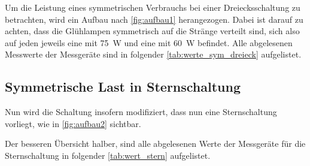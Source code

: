 \documentclass[12pt,english,ngerman]{scrartcl}
\begin{document}
Um die Leistung eines symmetrischen Verbrauchs bei einer Dreiecksschaltung zu
betrachten, wird ein Aufbau nach \autoref{fig:aufbau1} herangezogen. Dabei ist
darauf zu achten, dass die Glühlampen symmetrisch auf die Stränge verteilt
sind, sich also auf jeden jeweils eine mit \SI[]{75}{\watt} und eine mit
\SI[]{60}{\watt} befindet. Alle abgelesenen Messwerte der Messgeräte sind in
folgender \autoref{tab:werte_sym_dreieck} aufgelistet.

\begin{table}[H]
	\caption[Abgelesene Werte bei symmetrischer Belastung in Dreiecksschaltung] {Abgelesene
		Werte bei symmetrischer Belastung in Dreiecksschaltung                     \\
		$I_i \dots$ gemessener Strom am i-ten Strang in A                          \\
		$I_{31} \dots$ gemessener Strom zwischen Sternpunkt und Neutralleiter in A \\
		$U_{ij} \dots$ gemessene Spannung zwischen den Strängen i und j in V       \\
		$P_{i}^M \dots$ gemessene Wirkleistungen in W (für genaue Bezeichnung siehe \autoref{fig:aufbau1})
	}\label{tab:werte_sym_dreieck}
	\centering
	
	
\end{table}

\subsection{Symmetrische Last in Sternschaltung}

Nun wird die Schaltung insofern modifiziert, dass nun eine Sternschaltung
vorliegt, wie in \autoref{fig:aufbau2} sichtbar.

Der besseren Übersicht halber, sind alle abgelesenen Werte der Messgeräte für
die Sternschaltung in folgender \autoref{tab:wert_stern} aufgelistet.

\begin{table}[H]
	\caption[Abgelesene Werte bei Sternschaltung] {Abgelesene Werte bei Sternschaltung                                        \\
		1. Zeile \dots symmetrische Belastung                                      \\
		2. Zeile \dots asymmetrische Belastung                                     \\
		3. Zeile \dots asymmetrische Belastung mit simulierten Kabelbruch          \\
		$I_i \dots$ gemessener Strom am i-ten Strang in A                          \\
		$I_{31} \dots$ gemessener Strom zwischen Sternpunkt und Neutralleiter in A \\
		$U_{i} \dots$ gemessene Spannung am i-ten Strang in V                      \\
		$P_{i}^M \dots$ gemessene Wirkleistungen in W (für genaue Bezeichnung siehe \autoref{fig:aufbau2})
	}\label{tab:wert_stern}
	\centering
	
	
\end{table}
\end{document}
